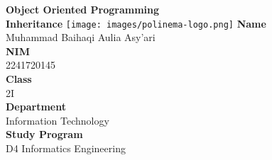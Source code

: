 \documentclass[12pt,titlepage]{article}
\newcommand{\vSubject}{Object Oriented Programming}
\newcommand{\vSubtitle}{Inheritance}
\newcommand{\vName}{Muhammad Baihaqi Aulia Asy'ari}
\newcommand{\vNIM}{2241720145}
\newcommand{\vClass}{2I}
\newcommand{\vDepartment}{Information Technology}
\newcommand{\vStudyProgram}{D4 Informatics Engineering}
\begin{document}
\begin{titlepage}
    \centering
    \vfill
    {\bfseries\LARGE
        \vSubject\\
        \vskip0.25cm
        \vSubtitle
    }
    \vfill
    \texttt{[image: images/polinema-logo.png]}
    \vfill
    {
        \textbf{Name}\\
        \vName\\
        \vskip0.5cm
        \textbf{NIM}\\
        \vNIM\\
        \vskip0.5cm
        \textbf{Class}\\
        \vClass\\
        \vskip0.5cm
        \textbf{Department}\\
        \vDepartment\\
        \vskip0.5cm
        \textbf{Study Program}\\
        \vStudyProgram
    }
\end{titlepage}

\newpage
\end{document}

